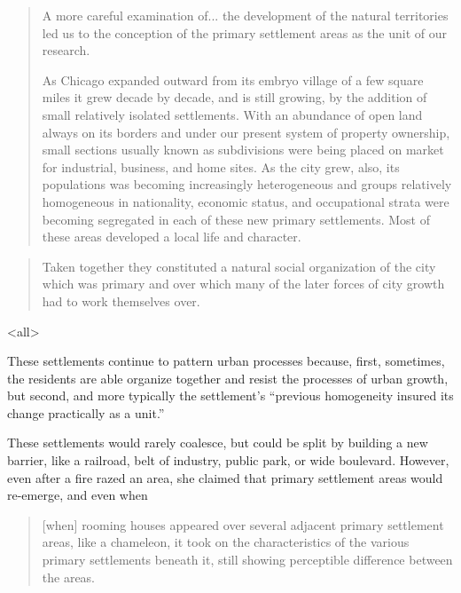 {\begin{quote}
  A more careful examination of... the development of the natural
  territories led us to the conception of the primary settlement areas
  as the unit of our research.

  As Chicago expanded outward from its embryo village of a few square
  miles it grew decade by decade, and is still growing, by the
  addition of small relatively isolated settlements. With an abundance
  of open land always on its borders and under our present system of
  property ownership, small sections usually known as subdivisions
  were being placed on market for industrial, business, and home
  sites. As the city grew, also, its populations was becoming
  increasingly heterogeneous and groups relatively homogeneous in
  nationality, economic status, and occupational strata were becoming
  segregated in each of these new primary settlements. Most of these
  areas developed a local life and character.
\end{quote}

\begin{frame}
\begin{quote}
  Taken together they constituted a natural social organization of the
  city which was primary and over which many of the later forces of
  city growth had to work themselves over.
\end{quote}
\end{frame}


\mode<all>{
}

These settlements continue to pattern urban processes because, first,
sometimes, the residents are able organize together and resist the
processes of urban growth, but second, and more typically the
settlement's ``previous homogeneity insured its change practically as
a unit.''

These settlements would rarely coalesce, but could be split by
building a new barrier, like a railroad, belt of industry, public
park, or wide boulevard. However, even after a fire razed an area, she
claimed that primary settlement areas would re-emerge, and even when

\begin{frame}
\begin{quote}
[when] rooming houses appeared over several adjacent primary settlement
areas, like a chameleon, it took on the characteristics of the various
primary settlements beneath it, still showing perceptible difference
between the areas.
\end{quote}
\end{frame}

}
